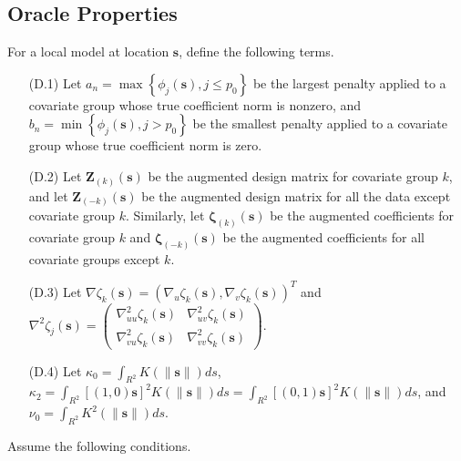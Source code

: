 \documentclass[12pt,english,authoryear, review]{article}\usepackage[]{graphicx}\usepackage[]{color}
\theoremstyle{plain}
\theoremstyle{plain}
\begin{document}
\subsection{Oracle Properties\label{sub:oracle-properties}}

For a local model at location $\bm{s}$, define the following terms.
\begin{itemize}
\item[(D.1)] Let $a_{n}=\max\left\{ \phi_{j}\left(\bm{s}\right),j\le p_{0}\right\} $
be the largest penalty applied to a covariate group whose true coefficient
norm is nonzero, and $b_{n}=\min\left\{ \phi_{j}\left(\bm{s}\right),j>p_{0}\right\} $
be the smallest penalty applied to a covariate group whose true coefficient
norm is zero.
\item[(D.2)] Let $\bm{Z}_{\left(k\right)}\left(\bm{s}\right)$ be the augmented
design matrix for covariate group $k$, and let $\bm{Z}_{\left(-k\right)}\left(\bm{s}\right)$
be the augmented design matrix for all the data except covariate group
$k$. Similarly, let $\bm{\zeta}_{\left(k\right)}\left(\bm{s}\right)$
be the augmented coefficients for covariate group $k$ and $\bm{\zeta}_{\left(-k\right)}\left(\bm{s}\right)$
be the augmented coefficients for all covariate groups except $k$.
\item[(D.3)] Let $\nabla\zeta_{k}\left(\bm{s}\right)=\left(\nabla_{u}\zeta_{k}\left(\bm{s}\right),\nabla_{v}\zeta_{k}\left(\bm{s}\right)\right)^{T}$
and $\nabla^{2}\zeta_{j}\left(\bm{s}\right)=\left(\begin{array}{cc}
\nabla_{uu}^{2}\zeta_{k}\left(\bm{s}\right) & \nabla_{uv}^{2}\zeta_{k}\left(\bm{s}\right)\\
\nabla_{vu}^{2}\zeta_{k}\left(\bm{s}\right) & \nabla_{vv}^{2}\zeta_{k}\left(\bm{s}\right)
\end{array}\right)$.
\item[(D.4)] Let $\kappa_{0}=\int_{R^{2}}K\left(\|\bm{s}\|\right)ds$, $\kappa_{2}=\int_{R^{2}}[(1,0)\bm{s}]^{2}K\left(\|\bm{s}\|\right)ds=\int_{R^{2}}[(0,1)\bm{s}]^{2}K\left(\|\bm{s}\|\right)ds$,
and $\nu_{0}=\int_{R^{2}}K^{2}\left(\|\bm{s}\|\right)ds$.
\end{itemize}
Assume the following conditions.
\end{document}
